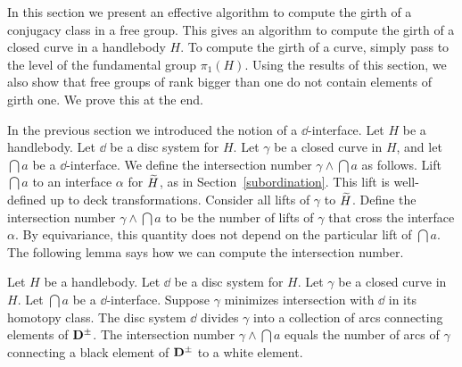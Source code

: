 In this section we present an effective algorithm to compute the girth of a conjugacy class in a free group.  This gives an algorithm to compute the girth of a closed curve in a handlebody $H$.  To compute the girth of a curve, simply pass to the level of the fundamental group $\pi_{1}(H)$.  Using the results of this section, we also show that free groups of rank bigger than one do not contain elements of girth one.  We prove this at the end.

In the previous section we introduced the notion of a $\dd$-interface.  Let $H$ be a handlebody.  Let $\dd$ be a disc system for $H$.  Let $\gamma$ be a closed curve in $H$, and let $\dint{a}$ be a $\dd$-interface.  We define the intersection number $\gamma\wedge\dint{a}$ as follows.  Lift $\dint{a}$ to an interface $\alpha$ for $\widetilde{H}$, as in Section~\ref{subordination}.  This lift is well-defined up to deck transformations.  Consider all lifts of $\gamma$ to $\widetilde{H}$.  Define the intersection number $\gamma\wedge\dint{a}$ to be the number of lifts of $\gamma$ that cross the interface $\alpha$.  By equivariance, this quantity does not depend on the particular lift of $\dint{a}$.  The following lemma says how we can compute the intersection number.

\begin{lemma}
\label{intersection handlebody}
Let $H$ be a handlebody.  Let $\dd$ be a disc system for $H$.  Let $\gamma$ be a closed curve in $H$.  Let $\dint{a}$ be a $\dd$-interface.  Suppose $\gamma$ minimizes intersection with $\dd$ in its homotopy class.  The disc system $\dd$ divides $\gamma$ into a collection of arcs connecting elements of $\mathbf{D}^\pm$.  The intersection number $\gamma\wedge\dint{a}$ equals the number of arcs of $\gamma$ connecting a black element of $\mathbf{D}^\pm$ to a white element.
\end{lemma}

